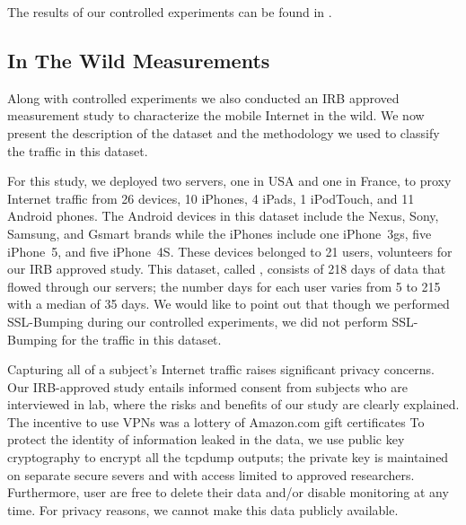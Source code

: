The results of our controlled experiments can be found in .

\subsection{In The Wild Measurements}

Along with controlled experiments we also conducted an IRB approved measurement study to characterize the mobile Internet in the wild.
We now present the description of the dataset and the methodology we used to classify the traffic in this dataset.

For this study, we deployed two \platname servers, one in USA and one in France, to proxy Internet traffic from 26 devices, 10 iPhones, 4 iPads, 1 iPodTouch, and 11 Android phones.
The Android devices in this dataset include the Nexus, Sony, Samsung, and Gsmart brands while the iPhones include one iPhone~3gs, five iPhone~5, and five iPhone~4S.
These devices belonged to 21 users, volunteers for our IRB approved study.
This dataset, called \mobWild, consists of 218 days of data that flowed through our \platname servers; the number days for each user varies from 5 to 215 with a median of 35 days.
We would like to point out that though we performed SSL-Bumping during our controlled experiments, we did not perform SSL-Bumping for the traffic in this dataset.

Capturing all of a subject's Internet traffic raises significant privacy concerns. 
Our IRB-approved study entails informed consent from subjects who are interviewed in lab, where the risks and benefits of our study are clearly explained. 
The incentive to use VPNs was a lottery of Amazon.com gift certificates
To protect the identity of information leaked in the data, we use public key cryptography to encrypt all the tcpdump outputs; the private key is maintained on separate secure severs and with access limited to approved researchers. 
Furthermore, user are free to delete their data and/or disable monitoring at any time. 
For privacy reasons, we cannot make this data publicly available.




